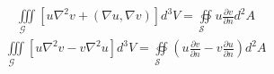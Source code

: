 \documentclass{article}
\def\Q#1#2{\frac{\partial #1}{\partial #2}}
\begin{document}
\begin{shaded}
\begin{align}
\underset{\mathcal{G}\quad}\iiint\!%
	\left[u\nabla^{2}v+\left(\nabla u,\nabla v\right)\right]d^{3}V%
	=\underset{\mathcal{S}\quad}\oiint u\Q{v}{n}d^{2}A
\end{align}
\begin{align}
\underset{{\mathcal{G}\quad}}\iiint\!%
	\left[u\nabla^{2}v-v\nabla^{2}u\right]d^{3}V%
	=\underset{\mathcal{S}\quad}\oiint%
	\left(u\Q{v}{n}-v\Q{u}{n}\right)d^{2}A
\end{align}
\end{shaded}
\end{document}
